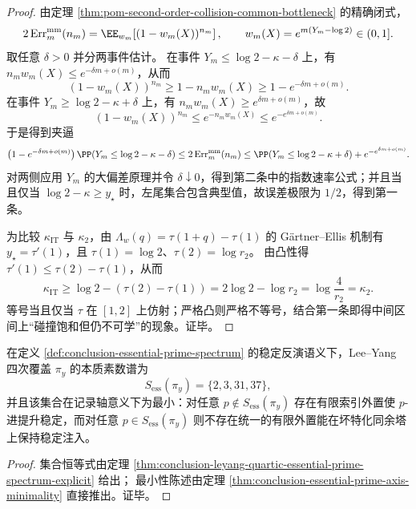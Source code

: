 \begin{proof}
由定理 \ref{thm:pom-second-order-collision-common-bottleneck} 的精确闭式，
\[
2\,\mathrm{Err}_m^{\mathrm{mm}}(n_m)=\EE_{w_m}\!\left[(1-w_m(X))^{n_m}\right],
\qquad
w_m(X)=e^{m(Y_m-\log 2)}\in(0,1].
\]
取任意 \(\delta>0\) 并分两事件估计。
在事件 \(Y_m\le \log 2-\kappa-\delta\) 上，有 \(n_m w_m(X)\le e^{-\delta m+o(m)}\)，从而
\[
(1-w_m(X))^{n_m}\ge 1-n_m w_m(X)\ge 1-e^{-\delta m+o(m)}.
\]
在事件 \(Y_m\ge \log 2-\kappa+\delta\) 上，有 \(n_m w_m(X)\ge e^{\delta m+o(m)}\)，故
\[
(1-w_m(X))^{n_m}\le e^{-n_m w_m(X)}\le e^{-e^{\delta m+o(m)}}.
\]
于是得到夹逼
\[
\bigl(1-e^{-\delta m+o(m)}\bigr)\,\PP\!\left(Y_m\le \log 2-\kappa-\delta\right)
\le
2\,\mathrm{Err}_m^{\mathrm{mm}}(n_m)
\le
\PP\!\left(Y_m\le \log 2-\kappa+\delta\right)+e^{-e^{\delta m+o(m)}}.
\]
对两侧应用 \(Y_m\) 的大偏差原理并令 \(\delta\downarrow 0\)，得到第二条中的指数速率公式；并且当且仅当 \(\log 2-\kappa\ge y_\star\) 时，左尾集合包含典型值，故误差极限为 \(1/2\)，得到第一条。
\par
为比较 \(\kappa_{\mathrm{IT}}\) 与 \(\kappa_2\)，由 \(\Lambda_w(q)=\tau(1+q)-\tau(1)\) 的 G\"artner--Ellis 机制有 \(y_\star=\tau'(1)\)，且 \(\tau(1)=\log 2\)、\(\tau(2)=\log r_2\)。
由凸性得 \(\tau'(1)\le \tau(2)-\tau(1)\)，从而
\[
\kappa_{\mathrm{IT}}
\ge
\log 2-(\tau(2)-\tau(1))
=
2\log 2-\log r_2
=
\log\frac{4}{r_2}
=\kappa_2.
\]
等号当且仅当 \(\tau\) 在 \([1,2]\) 上仿射；严格凸则严格不等号，结合第一条即得中间区间上“碰撞饱和但仍不可学”的现象。证毕。
\end{proof}

\begin{corollary}\label{cor:conclusion-leyang-minimal-obstruction-primes}
在定义 \ref{def:conclusion-essential-prime-spectrum} 的稳定反演语义下，Lee--Yang 四次覆盖 \(\pi_y\) 的本质素数谱为
\[
S_{\mathrm{ess}}(\pi_y)=\{2,3,31,37\},
\]
并且该集合在记录轴意义下为最小：对任意 \(p\notin S_{\mathrm{ess}}(\pi_y)\) 存在有限索引外置使 \(p\)-进提升稳定，而对任意 \(p\in S_{\mathrm{ess}}(\pi_y)\) 则不存在统一的有限外置能在坏特化同余塔上保持稳定注入。
\end{corollary}
\begin{proof}
集合恒等式由定理 \ref{thm:conclusion-leyang-quartic-essential-prime-spectrum-explicit} 给出；
最小性陈述由定理 \ref{thm:conclusion-essential-prime-axis-minimality} 直接推出。证毕。
\end{proof}

